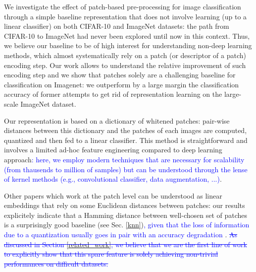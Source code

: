 \documentclass{article}
\newcommand{\Edouard}[1]{\textcolor{blue}{#1}}
\begin{document}
We investigate the effect of patch-based pre-processing for image classification through a simple baseline representation that does not involve learning  (up to a linear classifier) on both CIFAR-10 and ImageNet datasets: the path from CIFAR-10 to ImageNet had never been explored until now in this context.  Thus, we believe our baseline to be of high interest for understanding non-deep learning methods, which almost systematically rely on a patch (or descriptor of a patch) encoding step. Our work allows to understand the relative improvement of such encoding step and we show that patches solely are a challenging baseline for classification on Imagenet:  we outperform by a large margin the classification accuracy of former attempts to get rid of representation learning on the large-scale ImageNet dataset.


Our representation is based on a dictionary of whitened patches: pair-wise distances between this dictionary and the patches of each images are computed, quantized and then fed to a linear classifier. This method is  straightforward and involves a limited ad-hoc feature engineering compared to deep learning approach\Edouard{: here, we  employ modern  techniques that are necessary for scalability (from thausends to million of samples) but can be understood through the lense of kernel methods (e.g., convolutional classifier, data augmentation, ...)}. 


Other papers which work at the patch level can be understood as linear embeddings that rely on some Euclidean distances between patches: our results explicitely indicate that a Hamming distance between well-chosen set of patches is a surprisingly good baseline (see Sec. \ref{knn})\Edouard{, given that the loss of information due to a quantization usually goes in pair with an accuracy degradation \citep{coates2011analysis}}. \Edouard{\sout{As discussed in Section \ref{related_work}, we believe that we are the first line of work to explicitly show that this  spare feature is solely achieving non-trivial performances on difficult datasets.}}
\end{document}
